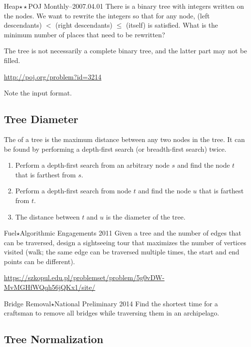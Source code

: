 \begin{pbox}{Heap$\star\star$}{POJ Monthly--2007.04.01}
There is a binary tree with integers written on the nodes. We want to rewrite the integers so that for any node, (left descendants) $<$ (right descendants) $\le$ (itself) is satisfied. What is the minimum number of places that need to be rewritten?

The tree is not necessarily a complete binary tree, and the latter part may not be filled.

\url{http://poj.org/problem?id=3214}
\end{pbox}
Note the input format.
\subsection{Tree Diameter}
The  of a tree is the maximum distance between any two nodes in the tree.
It can be found by performing a depth-first search (or breadth-first search) twice.
\begin{enumerate}
    \item Perform a depth-first search from an arbitrary node $s$ and find the node $t$ that is farthest from $s$.
    \item Perform a depth-first search from node $t$ and find the node $u$ that is farthest from $t$.
    \item The distance between $t$ and $u$ is the diameter of the tree.
\end{enumerate}

\begin{pbox}{Fuel$\star$}{Algorithmic Engagements 2011}
Given a tree and the number of edges that can be traversed, design a sightseeing tour that maximizes the number of vertices visited (walk; the same edge can be traversed multiple times, the start and end points can be different).

\url{https://szkopul.edu.pl/problemset/problem/5g0vDW-MvMGHfWQqh56jQKx1/site/}
\end{pbox}

\begin{pbox}{Bridge Removal$\star$}{National Preliminary 2014}
Find the shortest time for a craftsman to remove all bridges while traversing them in an archipelago.

\end{pbox}
\subsection{Tree Normalization}

